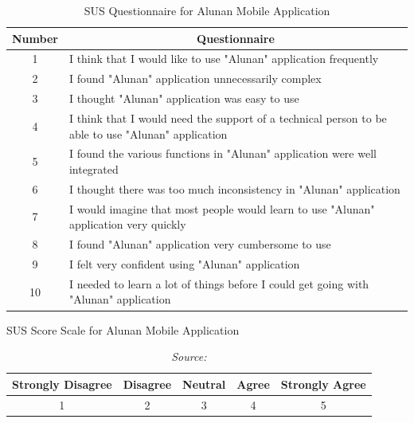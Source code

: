 \begin{enumerate}[A.]
    \begin{table}[htb]
    \caption{SUS Questionnaire for Alunan Mobile Application}
    \label{tab:mytable}
    \centering
    \begin{tabular}{|p{3cm}|p{12cm}|}
    \hline
    \multicolumn{1}{|c|}{\textbf{Number}} & 
    \multicolumn{1}{c|}{\textbf{Questionnaire}} \\
    \hline 
    \multicolumn{1}{|c|}{1} & I think that I would like to use "Alunan" application frequently \\ \hline
    \multicolumn{1}{|c|}{2} & I found "Alunan" application unnecessarily complex \\ \hline
    \multicolumn{1}{|c|}{3} & I thought "Alunan" application was easy to use \\ \hline
    \multicolumn{1}{|c|}{4} & I think that I would need the support of a technical person to be able to use "Alunan" application \\ \hline
    \multicolumn{1}{|c|}{5} & I found the various functions in "Alunan" application were well integrated \\ \hline
    \multicolumn{1}{|c|}{6} & I thought there was too much inconsistency in "Alunan" application \\ \hline
    \multicolumn{1}{|c|}{7} & I would imagine that most people would learn to use "Alunan" application very quickly \\ \hline
    \multicolumn{1}{|c|}{8} & I found "Alunan" application very cumbersome to use \\ \hline
    \multicolumn{1}{|c|}{9} & I felt very confident using "Alunan" application \\ \hline
    \multicolumn{1}{|c|}{10} & I needed to learn a lot of things before I could get going with "Alunan" application \\ \hline
    \end{tabular}
    \end{table}
    
    \begin{table}[htb]
    \caption{SUS Score Scale for Alunan Mobile Application}
    \caption*{\textit{Source: \textcite{brooke95}}} 
    \label{tab:mytable}
    \centering
    \begin{tabular}{|p{5cm}|p{10cm}|p{10cm}|p{10cm}|p{5cm}|}
    \hline
    \multicolumn{1}{|c|}{\textbf{Strongly Disagree}} & 
    \multicolumn{1}{c|}{\textbf{Disagree}} & 
    \multicolumn{1}{c|}{\textbf{Neutral}} & 
    \multicolumn{1}{c|}{\textbf{Agree}} & 
    \multicolumn{1}{c|}{\textbf{Strongly Agree}} \\
    \hline 
    \multicolumn{1}{|c|}{1} & \multicolumn{1}{c|}{2} & \multicolumn{1}{c|}{3} & \multicolumn{1}{c|}{4} & \multicolumn{1}{c|}{5}\\ \hline
    \end{tabular}
    \end{table}


\end{enumerate}
